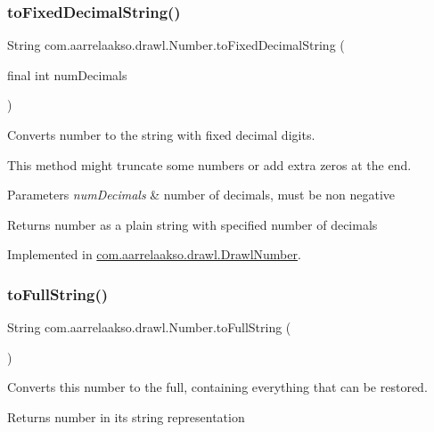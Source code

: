 \subsubsection{\texorpdfstring{to\+Fixed\+Decimal\+String()}{toFixedDecimalString()}}
{\footnotesize\ttfamily String com.\+aarrelaakso.\+drawl.\+Number.\+to\+Fixed\+Decimal\+String (\begin{DoxyParamCaption}\item[{final int}]{num\+Decimals }\end{DoxyParamCaption})}



Converts number to the string with fixed decimal digits. 

This method might truncate some numbers or add extra zeros at the end.


\begin{DoxyParams}{Parameters}
{\em num\+Decimals} & number of decimals, must be non negative \\
\hline
\end{DoxyParams}
\begin{DoxyReturn}{Returns}
number as a plain string with specified number of decimals 
\end{DoxyReturn}


Implemented in \hyperlink{classcom_1_1aarrelaakso_1_1drawl_1_1_drawl_number_a5fe84caaf56b210850be966218f70ca9}{com.\+aarrelaakso.\+drawl.\+Drawl\+Number}.

\mbox{\label{interfacecom_1_1aarrelaakso_1_1drawl_1_1_number_accc9efbfff1dfc0ff3d6352e3c1cfd4e}} 
\subsubsection{\texorpdfstring{to\+Full\+String()}{toFullString()}}
{\footnotesize\ttfamily String com.\+aarrelaakso.\+drawl.\+Number.\+to\+Full\+String (\begin{DoxyParamCaption}{ }\end{DoxyParamCaption})}



Converts this number to the full, containing everything that can be restored. 

\begin{DoxyReturn}{Returns}
number in it\textquotesingle{}s string representation 
\end{DoxyReturn}


